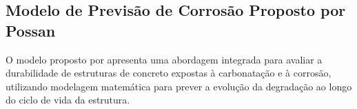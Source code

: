 


\subsection{Modelo de Previsão de Corrosão Proposto por Possan}

O modelo proposto por \textcite{possan2010} apresenta uma abordagem integrada para avaliar a durabilidade de estruturas de concreto expostas à carbonatação e à corrosão, utilizando modelagem matemática para prever a evolução da degradação ao longo do ciclo de vida da estrutura. 

